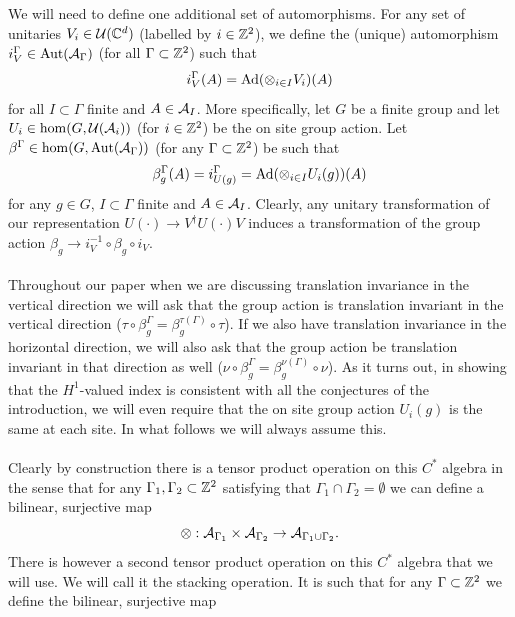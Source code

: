 \documentclass[12pt,a4paper,twoside]{article}
\numberwithin{equation}{section}
\begin{document}
We will need to define one additional set of automorphisms. For any set of unitaries $V_i\in\UU(\CC^d)$ (labelled by $i\in\ZZ^2$), we define the (unique) automorphism $i_V^\Gamma\in\Aut{\AA_\Gamma}$ (for all $\Gamma\subset \ZZ^2$) such that
\begin{equation}
i_V^\Gamma (A)=\Ad{\otimes_{i\in I} V_i}(A)
\end{equation}
for all $I\subset\Gamma$ finite and $A\in\AA_I$. More specifically, let $G$ be a finite group and let $U_i\in\hom(G,\UU(\AA_i))$ (for $i\in\ZZ^2$) be the on site group action. Let $\beta^\Gamma\in\hom(G,\Aut{\AA_\Gamma})$ (for any $\Gamma\subset\ZZ^2$) be such that
\begin{equation}
\beta^\Gamma_g(A)=i_{U(g)}^\Gamma=\Ad{\otimes_{i\in I} U_i(g)}(A)
\end{equation}
for any $g\in G$, $I\subset\Gamma$ finite and $A\in\AA_I$. Clearly, any unitary transformation of our representation $U(\cdot)\rightarrow V^\dagger U(\cdot) V$ induces a transformation of the group action $\beta_g\rightarrow i_{V}^{-1}\circ\beta_g\circ i_V$.\\\\
Throughout our paper when we are discussing translation invariance in the vertical direction we will ask that the group action is translation invariant in the vertical direction ($\tau\circ\beta_g^\Gamma=\beta_g^{\tau(\Gamma)}\circ\tau$). If we also have translation invariance in the horizontal direction, we will also ask that the group action be translation invariant in that direction as well ($\nu\circ\beta_g^\Gamma=\beta_g^{\nu(\Gamma)}\circ\nu$). As it turns out, in showing that the $H^1$-valued index is consistent with all the conjectures of the introduction, we will even require that the on site group action $U_i(g)$ is the same at each site. In what follows we will always assume this.\\\\
Clearly by construction there is a tensor product operation on this $C^*$ algebra in the sense that for any $\Gamma_1,\Gamma_2\subset\ZZ^2$ satisfying that $\Gamma_1\cap\Gamma_2=\emptyset$ we can define a bilinear, surjective map
\begin{equation}
\otimes:\AA_{\Gamma_1}\times\AA_{\Gamma_2}\rightarrow \AA_{\Gamma_1\cup\Gamma_2}.
\end{equation}
There is however a second tensor product operation on this $C^*$ algebra that we will use. We will call it the stacking operation. It is such that for any $\Gamma\subset\ZZ^2$ we define the bilinear, surjective map
\end{document}
